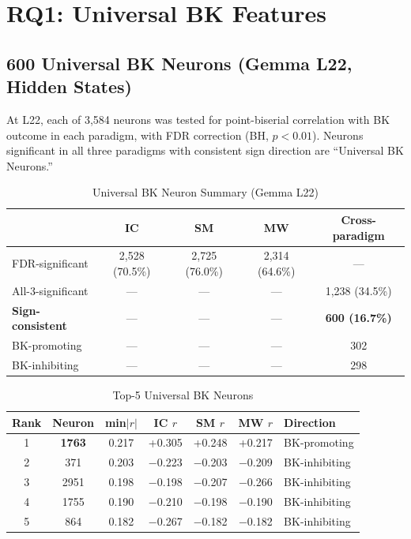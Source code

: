\documentclass[11pt,a4paper]{article}
\begin{document}
\section{RQ1: Universal BK Features}

\subsection{600 Universal BK Neurons (Gemma L22, Hidden States)}

At L22, each of 3,584 neurons was tested for point-biserial correlation with BK outcome in each paradigm, with FDR correction (BH, $p<0.01$). Neurons significant in all three paradigms with consistent sign direction are ``Universal BK Neurons.''

\begin{table}[H]
\centering
\caption{Universal BK Neuron Summary (Gemma L22)}\label{tab:t3}
\footnotesize
\begin{tabular}{lcccc}
\toprule
 & IC & SM & MW & Cross-paradigm \\
\midrule
FDR-significant     & 2,528 (70.5\%) & 2,725 (76.0\%) & 2,314 (64.6\%) & --- \\
All-3-significant   & --- & --- & --- & 1,238 (34.5\%) \\
\textbf{Sign-consistent} & --- & --- & --- & \textbf{600 (16.7\%)} \\
BK-promoting        & --- & --- & --- & 302 \\
BK-inhibiting       & --- & --- & --- & 298 \\
\bottomrule
\end{tabular}
\end{table}

\begin{table}[H]
\centering
\caption{Top-5 Universal BK Neurons}\label{tab:t4}
\footnotesize
\begin{tabular}{ccccccl}
\toprule
Rank & Neuron & min$|r|$ & IC $r$ & SM $r$ & MW $r$ & Direction \\
\midrule
1 & \textbf{1763} & 0.217 & +0.305 & +0.248 & +0.217 & BK-promoting \\
2 & 371   & 0.203 & $-$0.223 & $-$0.203 & $-$0.209 & BK-inhibiting \\
3 & 2951  & 0.198 & $-$0.198 & $-$0.207 & $-$0.266 & BK-inhibiting \\
4 & 1755  & 0.190 & $-$0.210 & $-$0.198 & $-$0.190 & BK-inhibiting \\
5 & 864   & 0.182 & $-$0.267 & $-$0.182 & $-$0.182 & BK-inhibiting \\
\bottomrule
\end{tabular}
\end{table}
\end{document}
